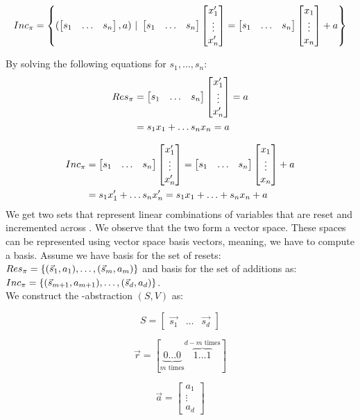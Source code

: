 \begin{equation*}
	Inc_\pi = \left\{(\begin{bmatrix} s_1 & \ldots &s_n \end{bmatrix}, a)\ |\ \begin{bmatrix} s_1 & \ldots &s_n \end{bmatrix} \begin{bmatrix} x_1' \\ \vdots \\ x_n' \end{bmatrix} = \begin{bmatrix} s_1 & \ldots &s_n \end{bmatrix} \begin{bmatrix} x_1 \\ \vdots \\ x_n \end{bmatrix} + a\right\}	
\end{equation*}
\begin{comment}
	\begin{equation*}
	Res_H = \left\{ (\s, a) | H \models \s \cdot \p = a \right\}	
	\end{equation*}
	
	\begin{equation*}
	Inc_H = \left\{(\s, a) | H \models \s \cdot \p = \s \cdot \up + a\right\}	
	\end{equation*}
\end{comment}
By solving the following equations for $s_1, \ldots, s_n$: \\
\begin{align*}
	Res_\pi &= \begin{bmatrix} s_1 & \ldots &s_n \end{bmatrix} \begin{bmatrix} x_1' \\ \vdots \\ x_n' \end{bmatrix} = a \\
 			&= s_1x_1 + \ldots s_nx_n = a
\end{align*}

\begin{align*}
	Inc_\trf &= \sn \pn = \sn \upn + a  \\ \vspace{0.5cm}
			 &= s_1x_1' + \ldots s_nx_n' = s_1x_1 + \ldots + s_nx_n + a
\end{align*}
We get two sets that represent linear combinations of variables that are reset and incremented across \trf. We observe that the two form a vector space. These spaces can be represented using vector space basis vectors, meaning, we have to compute a basis. Assume we have basis for the set of resets:
$Res_\pi = \{(\vec{s}_1, a_1), \ldots, (\vec{s}_m, a_m)\}$ and basis for the set of additions as: $Inc_\pi = \{(\vec{s}_{m+1}, a_{m+1}), \ldots, (\vec{s}_d, a_d)\}$. \\ We construct the \qvasr-abstraction $(S, V)$ as:
\begin{center}
\begin{minipage}{0.3\linewidth}
	\begin{equation*}
		S = \begin{bmatrix} \vec{s_1} & \ldots & \vec{s_d} \end{bmatrix}
	\end{equation*}
\end{minipage}
\begin{minipage}{0.3\linewidth}
	\begin{equation*}
		\vec{r} = [ \underbrace{0 \ldots 0}_{m\text{ times}} \overbrace{1 \ldots 1}^{d - m \text{ times}} ]
	\end{equation*}
\end{minipage}
\begin{minipage}{0.3\linewidth}
	\begin{equation*}
		\vec{a} = \begin{bmatrix} a_1 \\ \vdots \\ a_d \end{bmatrix}
	\end{equation*}
\end{minipage}
\end{center}


